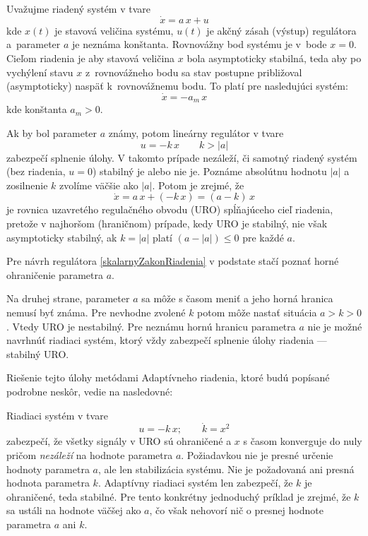 \documentclass[a4paper, 10pt, ]{article}
\begin{document}
Uvažujme riadený systém v tvare
\begin{equation} \label{DRsustavy}
	\dot{x} = a\, x + u
\end{equation}
kde $x(t)$ je stavová veličina systému, $u(t)$ je akčný zásah (výstup) regulátora a~parameter $a$ je neznáma konštanta. Rovnovážny bod systému je v~bode $x=0$. Cieľom riadenia je aby stavová veličina $x$ bola asymptoticky stabilná, teda aby po vychýlení stavu $x$ z~rovnovážneho bodu sa stav postupne približoval (asymptoticky) naspäť k~rovnovážnemu bodu.  To platí pre nasledujúci systém:
\begin{equation} \label{DRstabSustavy}
	\dot{x} = -a_m\, x
\end{equation}
kde konštanta $a_m > 0$.

Ak by bol parameter $a$ známy, potom lineárny regulátor v tvare
\begin{equation} \label{skalarnyZakonRiadenia}
	u = -k\, x \qquad k > \left| a \right|
\end{equation}
zabezpečí splnenie úlohy. V takomto prípade nezáleží, či samotný riadený systém (bez riadenia, $u=0$) stabilný je alebo nie je. Poznáme absolútnu hodnotu $\left| a \right|$ a zosilnenie $k$ zvolíme väčšie ako $\left| a \right|$. Potom je zrejmé, že
\begin{equation} \label{DRURO}
	\dot{x} = a\, x + \left( -k\, x \right) = \left(a-k\right)\,x
\end{equation}
je rovnica uzavretého regulačného obvodu (URO) spĺňajúceho cieľ riadenia, pretože v najhoršom (hraničnom) prípade, kedy URO je stabilný, nie však asymptoticky stabilný, ak $k = \left| a \right|$ platí $\left(a-\left| a \right|\right) \leq 0$ pre každé $a$.

Pre návrh regulátora \eqref{skalarnyZakonRiadenia} v podstate stačí poznať horné ohraničenie parametra $a$.

Na druhej strane, parameter $a$ sa môže s časom meniť a jeho horná hranica nemusí byť známa. Pre nevhodne zvolené $k$ potom môže nastať situácia $a>k>0$. Vtedy URO je nestabilný. Pre neznámu hornú hranicu parametra $a$ nie je možné navrhnúť riadiaci systém, ktorý vždy zabezpečí splnenie úlohy riadenia --- stabilný URO.

Riešenie tejto úlohy metódami Adaptívneho riadenia, ktoré budú popísané podrobne neskôr, vedie na nasledovné:

Riadiaci systém v tvare
\begin{equation} \label{adaptRiadiacSystem}
	u = -k\, x; \qquad \dot{k} = x^2
\end{equation}
zabezpečí, že všetky signály v URO sú ohraničené a $x$ s časom konverguje do nuly pričom \emph{nezáleží} na hodnote parametra $a$. Požiadavkou nie je presné určenie hodnoty parametra $a$, ale len stabilizácia systému. Nie je požadovaná ani presná hodnota parametra $k$. Adaptívny riadiaci systém len zabezpečí, že $k$ je ohraničené, teda stabilné. Pre tento konkrétny jednoduchý príklad je zrejmé, že $k$ sa ustáli na hodnote väčšej ako $a$, čo však nehovorí nič o presnej hodnote parametra $a$ ani $k$.
\end{document}
